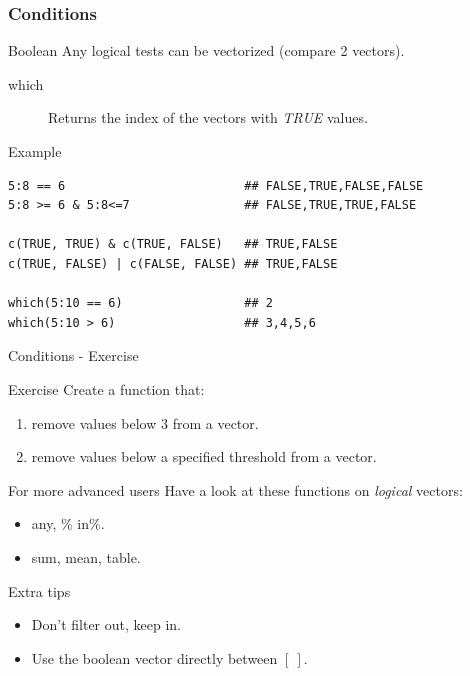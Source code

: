 \documentclass[10pt]{beamer}
\newenvironment{xframe}[2][]
  {\begin{frame}[fragile,environment=xframe,#1]
  \frametitle{#2}}
  {\end{frame}}
\begin{document}
\begin{xframe}{Conditions}
  \begin{block}{Boolean}
  Any logical tests can be vectorized (compare 2 {\sf vector}s).
    \begin{description}
    \item[which] Returns the index of the {\sf vector}s with {\it TRUE} values.
    \end{description}
  \end{block}
  \begin{exampleblock}{Example}
\begin{verbatim}
5:8 == 6                         ## FALSE,TRUE,FALSE,FALSE
5:8 >= 6 & 5:8<=7                ## FALSE,TRUE,TRUE,FALSE

c(TRUE, TRUE) & c(TRUE, FALSE)   ## TRUE,FALSE
c(TRUE, FALSE) | c(FALSE, FALSE) ## TRUE,FALSE

which(5:10 == 6)                 ## 2
which(5:10 > 6)                  ## 3,4,5,6
\end{verbatim}  
  \end{exampleblock}
\end{xframe}

\begin{frame}{Conditions - Exercise}
  \begin{block}{Exercise}
  Create a function that: 
  \begin{enumerate}
  \item remove values below $3$ from a {\sf vector}.
  \item  remove values below a specified threshold from a {\sf vector}.
  \end{enumerate}
  \end{block}

  \bigskip

  \begin{block}{For more advanced users}
    Have a look at these functions on {\it logical} vectors:
    \begin{itemize}
    \item any, $\%$ in$\%$.
    \item sum, mean, table.
    \end{itemize}
  \end{block}

  \bigskip

  \begin{block}{Extra tips}
    \begin{itemize}
    \item Don't filter out, keep in.
    \item Use the boolean vector directly between $[~]$.
    \end{itemize}
  \end{block}
\end{frame}
\end{document}
